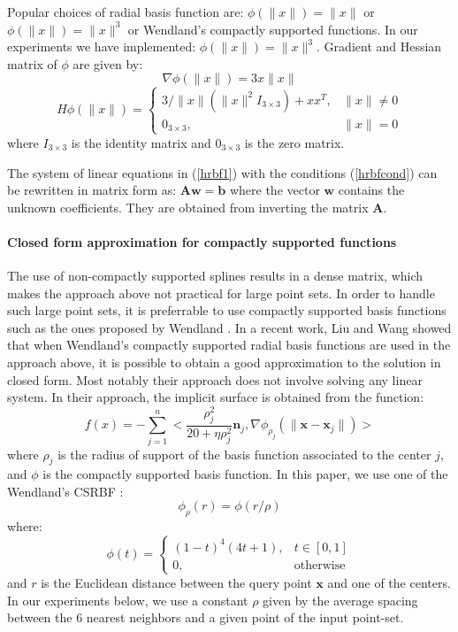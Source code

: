 \documentclass[ams]{U-AizuGT}
\def\x{\mathbf{x}}
\def\n{\mathbf{n}}
\begin{document}
Popular choices of radial basis function are: 
$\phi(\|x\|) = \|x\|$ or $\phi(\|x\|) = \|x\|^3$ or Wendland's compactly supported functions.
In our experiments we have implemented: $\phi(\|x\|) = \|x\|^3$.
Gradient and Hessian matrix of $\phi$ are given by:
\[\nabla\phi(\|x\|) = 3x\|x\|\]
\[ H \phi (\|x\|)= \left\{ \begin{array}{ll} 3/\|x\|(\|x\|^2I_{3\times3}) + xx^T, & \|x\| \neq 0\\ 
0_{3\times3}, &\|x\| = 0 \end{array}\right.\]
where $I_{3\times3}$ is the identity matrix and $0_{3\times3}$ is the zero matrix.

The system of linear equations in (\ref{hrbf1}) with the conditions (\ref{hrbfcond}) can be 
rewritten in matrix form as:
$\mathbf{A} \mathbf{w} = \mathbf{b}$
where the vector $\mathbf{w}$ contains the unknown coefficients. 
They are obtained from inverting the matrix $\mathbf{A}$.

\paragraph{Closed form approximation for compactly supported functions}
The use of non-compactly supported splines results in a dense matrix, 
which makes the approach above not practical for large point sets.
In order to handle such large point sets, it is preferrable to use 
compactly supported basis functions such as the ones proposed 
by Wendland \cite{MGV11}. 
In a recent work, Liu and Wang \cite{LW15} showed that when Wendland's 
compactly supported radial basis functions are used in the approach above, 
it is possible to obtain a good approximation to the solution in closed form.
Most notably their approach does not involve solving any linear system.
In their approach, the implicit surface is obtained from the function:  
\begin{equation} \label{hrbfclosed}
f(x)=-\sum_{j=1}^n<\frac{\rho^2_j}{20+\eta\rho^2_j} \n_j, \nabla\phi_{\rho_j}(\|\x-\x_j\|)>
\end{equation}
where $\rho_j$ is the radius of support of the basis function associated to the center $j$, 
and $\phi$ is the compactly supported basis function. 
In this paper, we use one of the Wendland's CSRBF \cite{WP95}: 
\[
\phi_{\rho}(r)=\phi(r/\rho)
\]
where:
\[
\phi (t)= \left\{ \begin{array}{ll} (1-t)^{4}(4t+1), & t \in [0,1]\\ 
0, & \text{otherwise} \end{array}\right.
\]
and $r$ is the Euclidean distance between the query point $\x$ and one of 
the centers.
In our experiments below, we use a constant $\rho$ given by 
the average spacing between the $6$ nearest neighbors and a given point 
of the input point-set. 
\end{document}
